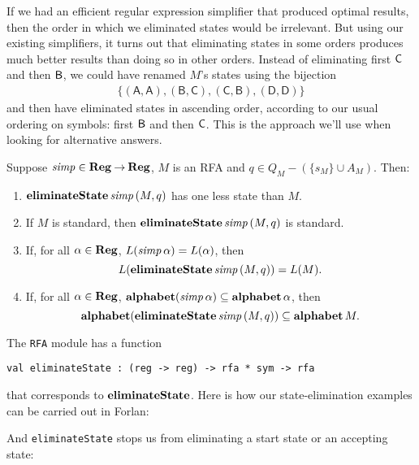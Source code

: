 If we had an efficient regular expression simplifier that produced
optimal results, then the order in which we eliminated states would be
irrelevant.  But using our existing simplifiers, it turns out that
eliminating states in some orders produces much better results than
doing so in other orders.  Instead of eliminating first $\mathsf{C}$ and then
$\mathsf{B}$, we could have renamed $M$'s states using the bijection
\begin{gather*}
\{\mathsf{(A, A), (B, C), (C, B), (D, D)}\}  
\end{gather*}
and then have eliminated states in ascending order, according
to our usual ordering on symbols: first $\mathsf{B}$ and then $\mathsf{C}$.
This is the approach we'll use when looking for alternative answers.

\begin{proposition}
Suppose ${\it simp}\in\mathbf{Reg}\mathbin{\to}\mathbf{Reg}$, $M$ is an RFA and $q\in
Q_M-(\{s_M\}\cup A_M)$.  Then:
\begin{enumerate}[\quad(1)]
\item $\mathbf{eliminateState}\,{\it simp}\,(M,q)$ has one less state than $M$.

\item If $M$ is standard, then $\mathbf{eliminateState}\,{\it simp}\,(M,q)$ is standard.

\item If, for all $\alpha\in\mathbf{Reg}$, $L({\it simp}\,\alpha) = L(\alpha)$,
  then
  \begin{displaymath}
    L(\mathbf{eliminateState}\,{\it simp}\,(M,q)) = L(M) .  
  \end{displaymath}

\item If, for all $\alpha\in\mathbf{Reg}$, $\mathbf{alphabet}({\it simp}\,\alpha)\subseteq
  \mathbf{alphabet}\,\alpha$, then
  \begin{displaymath}
    \mathbf{alphabet}(\mathbf{eliminateState}\,{\it simp}\,(M,q)) \subseteq \mathbf{alphabet}\,M .
  \end{displaymath}
\end{enumerate}
\end{proposition}

The \texttt{RFA} module has a function
\begin{verbatim}
val eliminateState : (reg -> reg) -> rfa * sym -> rfa
\end{verbatim}
%
that corresponds to $\mathbf{eliminateState}$.
Here is how our state-elimination examples can be carried out in Forlan:

And \texttt{eliminateState} stops us from eliminating a start state or
an accepting state:


